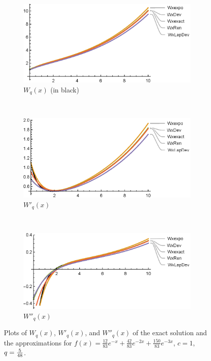 \begin{figure}[!h]
    \centering
    \begin{subfigure}[b]{0.8\textwidth}
        \includegraphics[width=\textwidth]{MixExp83W.eps}
        \caption{$W_q(x)$  (in black)}
        \label{fig:MixExp83W}
    \end{subfigure}
    ~
    \\
    \begin{subfigure}[b]{0.8\textwidth}
        \includegraphics[width=\textwidth]{MixExp83W1}
        \caption{$W'_q(x)$}
        \label{fig:MixExp83W1}
    \end{subfigure}
    ~
    \\
    \begin{subfigure}[b]{0.8\textwidth}
        \includegraphics[width=\textwidth]{MixExp83W2}
        \caption{$W''_q(x)$}
        \label{fig:MixExp83W2}
    \end{subfigure}
    \caption{Plots of $W_q(x)$, $W'_q(x)$, and $W''_q(x)$ of the exact solution and the approximations for $f(x)=\frac{12}{83 }e^{-x}+\frac{42}{83} e^{-2 x}+\frac{150}{83}e^{-3x}$, $c=1$, $q=\frac{5}{48}$.}\label{fig:MixExp83}
\end{figure}

